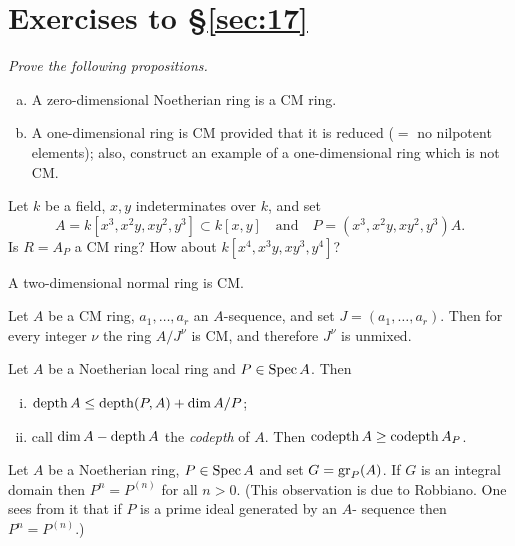 \section*{Exercises to \S\ref{sec:17}}
\emph{Prove the following propositions.}

\begin{exercise}\label{ex:17.1-ex}
\begin{enumerate}[(a)]
  \item A zero-dimensional Noetherian ring is a CM ring.
  \item A one-dimensional ring is CM provided that it is reduced ($=$ no
        nilpotent elements); also, construct an example of a one-dimensional ring
        which is not CM.
\end{enumerate}
\end{exercise}

\begin{exercise}\label{ex:17.2-ex}
Let $k$ be a field, $x, y$ indeterminates over $k$, and set
\[
  A = k[x^3, x^2y, xy^2, y^3] \subset k[x, y] \quad \text{and} \quad P = (x^3, x^2y, xy^2, y^3)A.
\]
Is $R = A_P$ a CM ring? How about
$k[x^4, x^3y, xy^3, y^4]$?
\end{exercise}

\begin{exercise}\label{ex:17.3-ex}
A two-dimensional normal ring is CM.
\end{exercise}

\begin{exercise}\label{ex:17.4-ex}
Let $A$ be a CM ring, $a_1, \ldots, a_r$ an $A$-sequence, and set $J = (a_1, \ldots, a_r)$. Then
for every integer $\nu$ the ring $A/J^\nu$ is CM, and therefore $J^\nu$ is unmixed.
\end{exercise}

\begin{exercise}\label{ex:17.5-ex}
Let $A$ be a Noetherian local ring and $P \in \operatorname{Spec} A$. Then
\begin{enumerate}[(i)]
  \item $\operatorname{depth} A \le \operatorname{depth} (P, A) + \dim A/P$;
  \item call $\dim A - \operatorname{depth} A$ the \emph{codepth} of $A$. Then $\operatorname{codepth} A \ge
        \operatorname{codepth} A_P$.
\end{enumerate}
\end{exercise}

\begin{exercise}\label{ex:17.6-ex}
Let $A$ be a Noetherian ring, $P \in \operatorname{Spec} A$ and set $G = \operatorname{gr}_P(A)$. If $G$ is an
integral domain then $P^n = P^{(n)}$ for all $n > 0$. (This observation is due to
Robbiano. One sees from it that if $P$ is a prime ideal generated by an $A$-
sequence then $P^n = P^{(n)}$.)
\end{exercise}
